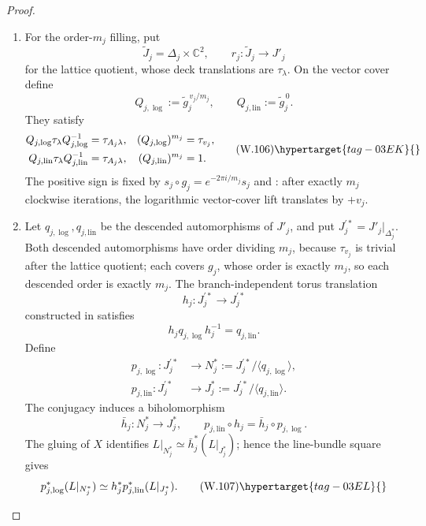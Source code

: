 \begin{proof}
\begin{enumerate}[label=\arabic*.,leftmargin=*]
\item For the order-\(m_j\) filling, put
\[
 \widetilde J_j=\Delta_j\times\mathbb C^2,\qquad
 r_j:\widetilde J_j\longrightarrow J'_j
\]
for the lattice quotient, whose deck translations are \(\tau_\lambda\).
On the vector cover define
\[
 Q_{j,\log}:=\widetilde g_j^{\,v_j/m_j},\qquad
 Q_{j,\mathrm{lin}}:=\widetilde g_j^{\,0}.
\]
They satisfy
\[
\begin{aligned}
 Q_{j,\log}\tau_\lambda Q_{j,\log}^{-1}
  &=\tau_{A_j\lambda},&
 (Q_{j,\log})^{m_j}&=\tau_{v_j},\\
 Q_{j,\mathrm{lin}}\tau_\lambda Q_{j,\mathrm{lin}}^{-1}
  &=\tau_{A_j\lambda},&
 (Q_{j,\mathrm{lin}})^{m_j}&=1.
\end{aligned}
\tag{W.106}\hypertarget{tag-03EK}{}\label{wbII:eq:W:5.17-A14}
\]
The positive sign is fixed by
\(s_j\circ g_j=e^{-2\pi i/m_j}s_j\) and : after exactly
\(m_j\) clockwise iterations, the logarithmic vector-cover lift translates
by \(+v_j\).

\item Let \(q_{j,\log},q_{j,\mathrm{lin}}\) be the descended automorphisms of \(J'_j\),
and put \(J_j^{\prime *}=J'_j|_{\Delta_j^*}\).  Both descended automorphisms have
order dividing \(m_j\), because \(\tau_{v_j}\) is trivial after the lattice
quotient; each covers \(g_j\), whose order is exactly \(m_j\), so each
descended order is exactly \(m_j\).
The branch-independent torus translation
\[
 h_j:J_j^{\prime *}\longrightarrow J_j^{\prime *}
\]
constructed in  satisfies
\[
 h_jq_{j,\log}h_j^{-1}=q_{j,\mathrm{lin}}.
\]
Define
\[
\begin{aligned}
 p_{j,\log}:J_j^{\prime *}&\longrightarrow
  N_j^*:=J_j^{\prime *}/\langle q_{j,\log}\rangle,\\
 p_{j,\mathrm{lin}}:J_j^{\prime *}&\longrightarrow
 J_j^*:=J_j^{\prime *}/\langle q_{j,\mathrm{lin}}\rangle .
\end{aligned}
\]
The conjugacy induces a biholomorphism
\[
 \bar h_j:N_j^*\longrightarrow J_j^*,\qquad
 p_{j,\mathrm{lin}}\circ h_j=\bar h_j\circ p_{j,\log}.
\]
The gluing of \(X\) identifies
\(L|_{N_j^*}\simeq\bar h_j^*(L|_{J_j^*})\); hence the
line-bundle square gives
\[
 p_{j,\log}^*(L|_{N_j^*})
 \simeq h_j^*p_{j,\mathrm{lin}}^*(L|_{J_j^*}).
\tag{W.107}\hypertarget{tag-03EL}{}\label{wbII:eq:W:5.17-A14a}
\]


\end{enumerate}
\end{proof}
